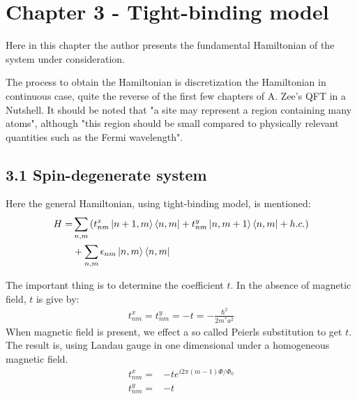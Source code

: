 \documentclass{article}
\numberwithin{equation}{subsection} %
\theoremstyle{definition}
\begin{document}
\section{Chapter 3 - Tight-binding model}
\label{sec:Chapter_3_Tight-binding_model}

Here in this chapter the author presents the fundamental Hamiltonian of
the system under consideration.

The process to obtain the Hamiltonian is discretization the Hamiltonian
in continuous case, quite the reverse of the first few chapters of
A. Zee's QFT in a Nutshell. It should be noted that "a site may represent 
a region containing many atoms", although "this region should be small 
compared to physically relevant quantities such as the Fermi wavelength".

    \subsection{3.1 Spin-degenerate system}
    \label{sec:3.1_Spin-degenerate_system}
    Here the general Hamiltonian, using tight-binding model, is
    mentioned:
    \begin{align}
        H = &\sum_{n,m} 
            \left( t^x_{nm}\ket{n+1,m}\bra{n,m}
                +t^y_{nm}\ket{n,m+1}\bra{n,m}+h.c.\right)\nonumber\\
            &+\sum_{n,m} \epsilon_{nm}\ket{n,m}\bra{n,m}
    \end{align}

    The important thing is to determine the coefficient $t$.
    In the absence of magnetic field, $t$ is give by:
    \begin{align}
        t^x_{nm}=t^y_{nm}=-t=-\frac{\hbar^2}{2m^* a^2}
    \end{align}
    When magnetic field is present, we effect a so called Peierls
    substitution to get $t$.
    The result is, using Landau gauge in one dimensional under a
    homogeneous magnetic field.
    \begin{align}
        t^x_{nm} =& -t e^{i2\pi (m-1) \Phi/\Phi_0} \\
        t^y_{nm} =& -t
    \end{align}
\end{document}
